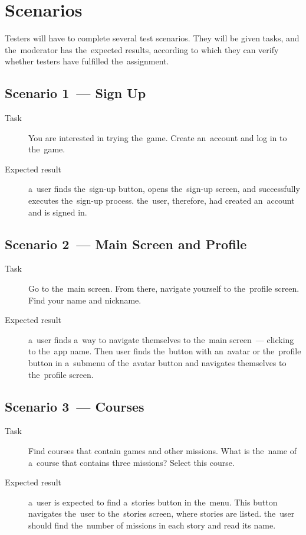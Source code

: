\section{Scenarios}

Testers will have to complete several test scenarios.
They will be given tasks, and the~moderator has the~expected results, according to which they can verify whether testers have fulfilled the~assignment.

\subsection*{Scenario 1~--- Sign Up}

\begin{description}
    \item[Task] You are interested in trying the~game.
    Create an~account and log in to the~game.
    \item[Expected result] a~user finds the~sign-up button, opens the~sign-up screen, and successfully executes the~sign-up process.
    the~user, therefore, had created an~account and is signed in.
\end{description}

\subsection*{Scenario 2~--- Main Screen and Profile}

\begin{description}
    \item[Task] Go to the~main screen.
    From there, navigate yourself to the~profile screen.
    Find your name and nickname.
    \item[Expected result] a~user finds a~way to navigate themselves to the~main screen~--- clicking to the~app name.
    Then user finds the~button with an~avatar or the~profile button in a~submenu of the~avatar button and navigates themselves to the~profile screen.
\end{description}

\subsection*{Scenario 3~--- Courses}

\begin{description}
    \item[Task] Find courses that contain games and other missions.
    What is the~name of a~course that contains three missions?
    Select this course.
    \item[Expected result] a~user is expected to find a~stories button in the~menu.
    This button navigates the~user to the~stories screen, where stories are listed.
    the~user should find the~number of missions in each story and read its name.
\end{description}

